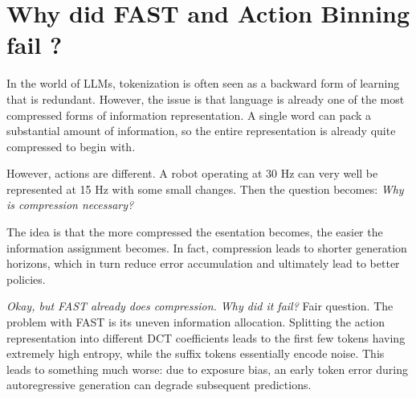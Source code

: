 \section{Why did FAST and Action Binning fail ?}

In the world of LLMs, tokenization is often seen as a backward form of learning
that is redundant. However, the issue is that language is already one of the
most compressed forms of information representation. A single word can pack a
substantial amount of information, so the entire representation is already quite
compressed to begin with.

However, actions are different. A robot operating at 30 Hz can very well be
represented at 15 Hz with some small changes. Then the question becomes:
\emph{Why is compression necessary?}

The idea is that the more compressed the esentation becomes, the easier the
information assignment becomes. In fact, compression leads to shorter generation
horizons, which in turn reduce error accumulation and ultimately lead to better
policies.

\emph{Okay, but FAST already does compression. Why did it fail?} Fair question.
The problem with FAST is its uneven information allocation. Splitting the action
representation into different DCT coefficients leads to the first few tokens
having extremely high entropy, while the suffix tokens essentially encode noise.
This leads to something much worse: due to exposure bias, an early token error
during autoregressive generation can degrade subsequent predictions.
